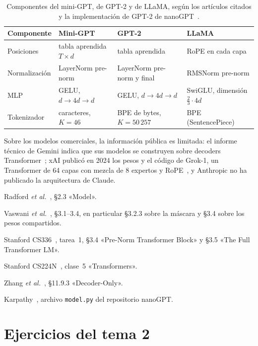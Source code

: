 \begin{table}[h]
\centering\small
\caption{Componentes del mini-GPT, de GPT-2 y de LLaMA, según los artículos citados y la implementación de GPT-2 de nanoGPT~\cite{nanogpt}.}\label{tab:arquitecturas}
\begin{tabularx}{\textwidth}{@{}l>{\raggedright\arraybackslash}X>{\raggedright\arraybackslash}X>{\raggedright\arraybackslash}X@{}}
\toprule
Componente & Mini-GPT & GPT-2~\cite{gpt2} & LLaMA~\cite{llama} \\
\midrule
Posiciones & tabla aprendida $T\times d$ & tabla aprendida & RoPE en cada capa \\
Normalización & LayerNorm pre-norm & LayerNorm pre-norm y final & RMSNorm pre-norm \\
MLP & GELU, $d\to 4d\to d$ & GELU, $d\to 4d\to d$ & SwiGLU, dimensión $\tfrac23\cdot 4d$ \\
Tokenizador & caracteres, $K=46$ & BPE de bytes, $K=50\,257$ & BPE (SentencePiece) \\
\bottomrule
\end{tabularx}
\end{table}

Sobre los modelos comerciales, la información pública es limitada: el informe técnico de Gemini indica que sus modelos se construyen sobre decoders Transformer~\cite[§2]{gemini}; xAI publicó en 2024 los pesos y el código de Grok-1, un Transformer de 64 capas con mezcla de 8 expertos y RoPE~\cite{grok1}, y Anthropic no ha publicado la arquitectura de Claude.

\begin{lecturas}
\item Radford \emph{et al.}~\cite{gpt2}, §2.3 «Model».
\item Vaswani \emph{et al.}~\cite{vaswani}, §3.1--3.4, en particular §3.2.3 sobre la máscara y §3.4 sobre los pesos compartidos.
\item Stanford CS336~\cite{cs336}, tarea~1, §3.4 «Pre-Norm Transformer Block» y §3.5 «The Full Transformer LM».
\item Stanford CS224N~\cite{cs224n}, clase~5 «Transformers».
\item Zhang \emph{et al.}~\cite{d2l}, §11.9.3 «Decoder-Only».
\item Karpathy~\cite{nanogpt}, archivo \texttt{model.py} del repositorio nanoGPT.
\end{lecturas}

\section*{Ejercicios del tema 2}

